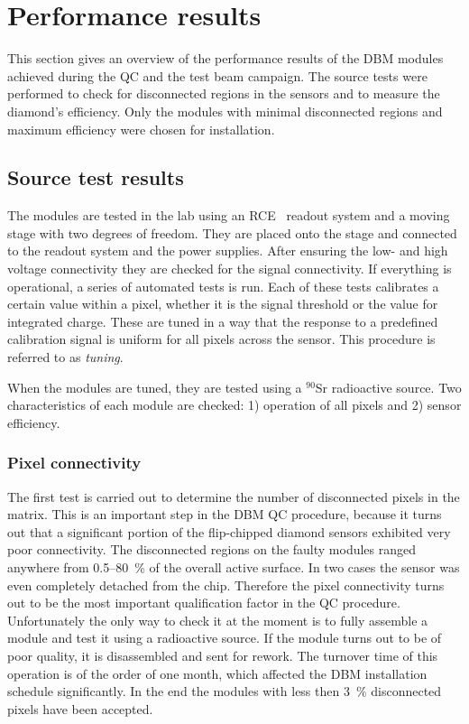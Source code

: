 \section{Performance results}
\label{sec:perfresults}
This section gives an overview of the performance results of the DBM modules achieved during the QC and the test beam campaign. The source tests were performed to check for disconnected regions in the sensors and to measure the diamond's efficiency. Only the modules with minimal disconnected regions and maximum efficiency were chosen for installation. 


\subsection{Source test results}
The modules are tested in the lab using an RCE~\cite{} readout system and a moving stage with two degrees of freedom. They are placed onto the stage and connected to the readout system and the power supplies. After ensuring the low- and high voltage connectivity they are checked for the signal connectivity. If everything is operational, a series of automated tests is run. Each of these tests calibrates a certain value within a pixel, whether it is the signal threshold or the value for integrated charge. These are tuned in a way that the response to a predefined calibration signal is uniform for all pixels across the sensor. This procedure is referred to as \emph{tuning}. 

When the modules are tuned, they are tested using a $^{90}$Sr radioactive source. Two characteristics of each module are checked: 1) operation of all pixels and 2) sensor efficiency. 


\subsubsection{Pixel connectivity}
The first test is carried out to determine the number of disconnected pixels in the matrix.
This is an important step in the DBM QC procedure, because it turns out that a significant portion of the flip-chipped diamond sensors exhibited very poor connectivity. The disconnected regions on the faulty modules ranged anywhere from 0.5--80~\% of the overall active surface. In two cases the sensor was even completely detached from the chip. Therefore the pixel connectivity turns out to be the most important qualification factor in the QC procedure. Unfortunately the only way to check it at the moment is to fully assemble a module and test it using a radioactive source. If the module turns out to be of poor quality, it is disassembled and sent for rework. The turnover time of this operation is of the order of one month, which affected the DBM installation schedule significantly. In the end the modules with less then 3~\% disconnected pixels have been accepted.

